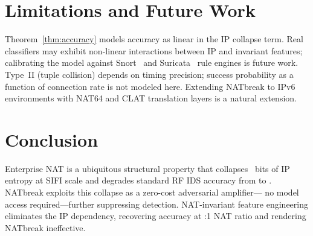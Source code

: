 \documentclass[conference]{IEEEtran}
\begin{document}
\section{Limitations and Future Work}

Theorem~\ref{thm:accuracy} models accuracy as linear in the IP collapse term.
Real classifiers may exhibit non-linear interactions between IP and invariant
features; calibrating the model against Snort~\cite{Snort} and
Suricata~\cite{Suricata} rule engines is future work.
Type~II (tuple collision) depends on timing precision; success probability
as a function of connection rate is not modeled here.
Extending NATbreak to IPv6 environments with NAT64 and CLAT translation
layers is a natural extension.

\section{Conclusion}

Enterprise NAT is a ubiquitous structural property that collapses
\LemmaOneCollapseBits{}~bits of IP entropy at SIFI scale and degrades
standard RF IDS accuracy from \RfBaselineAcc{} to \TheoremOneRfNatAcc{}.
NATbreak exploits this collapse as a zero-cost adversarial amplifier---
no model access required---further suppressing detection.
NAT-invariant feature engineering eliminates the IP dependency, recovering
\InvRfAccAtSifi{} accuracy at \NatRatioLarge{}:1 NAT ratio and rendering
NATbreak ineffective.



\end{document}
